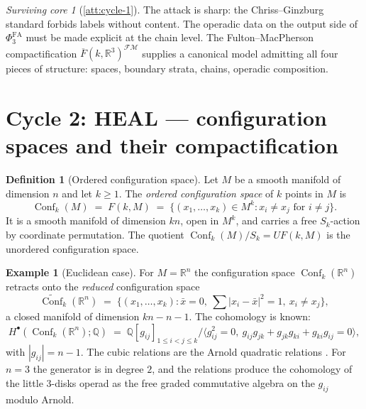 \documentclass[11pt]{article}
\theoremstyle{definition}
\newtheorem{definition}[theorem]{Definition}
\newtheorem{example}[theorem]{Example}
\theoremstyle{remark}
\newtheorem{survivor}[theorem]{Surviving core}
\DeclareMathOperator{\Conf}{Conf}
\newcommand{\FMbar}{\overline{F}}
\newcommand{\FM}{\mathcal{FM}}
\newcommand{\PhiFA}{\Phi^{\mathrm{FA}}}
\begin{document}
\begin{survivor}[\ref{att:cycle-1}]
The attack is sharp: the Chriss--Ginzburg standard forbids labels
without content. The operadic data on the output side of $\PhiFA_3$
must be made explicit at the chain level. The Fulton--MacPherson
compactification $\FMbar(k, \mathbb{R}^3)^{\FM}$
\cite[Ann.\ of Math.\ 139, 1994, \S 1]{FultonMacPherson1994}
supplies a canonical model admitting all four pieces of structure:
spaces, boundary strata, chains, operadic composition.
\end{survivor}

\section{Cycle 2: HEAL --- configuration spaces and their compactification}

\begin{definition}[Ordered configuration space]
\label{def:conf-space}
Let $M$ be a smooth manifold of dimension $n$ and let $k \geq 1$.
The \emph{ordered configuration space} of $k$ points in $M$ is
\[
 \Conf_k(M) \;=\; F(k, M) \;=\; \bigl\{(x_1, \ldots, x_k) \in M^k :
  x_i \neq x_j \text{ for } i \neq j \bigr\}.
\]
It is a smooth manifold of dimension $kn$, open in $M^k$, and carries
a free $S_k$-action by coordinate permutation. The quotient
$\Conf_k(M)/S_k = UF(k, M)$ is the unordered configuration space.
\end{definition}

\begin{example}[Euclidean case]
\label{ex:conf-Rn}
For $M = \mathbb{R}^n$ the configuration space $\Conf_k(\mathbb{R}^n)$
retracts onto the \emph{reduced} configuration space
\[
 \widetilde{\Conf}_k(\mathbb{R}^n)
 \;=\; \{(x_1, \ldots, x_k) :
        \bar x = 0,\ \sum |x_i - \bar x|^2 = 1,\ x_i \neq x_j\},
\]
a closed manifold of dimension $kn - n - 1$. The cohomology is known:
\[
 H^\bullet(\Conf_k(\mathbb{R}^n); \mathbb{Q})
 \;=\; \mathbb{Q}[g_{ij}]_{1 \leq i < j \leq k}
        /\langle g_{ij}^2 = 0,\ g_{ij} g_{jk} + g_{jk} g_{ki} + g_{ki} g_{ij} = 0 \rangle,
\]
with $|g_{ij}| = n - 1$. The cubic relations are the Arnold
quadratic relations \cite[Arnold 1969]{Arnold1969}. For $n = 3$
the generator is in degree $2$, and the relations produce the
cohomology of the little $3$-disks operad as the free graded
commutative algebra on the $g_{ij}$ modulo Arnold.
\end{example}
\end{document}
